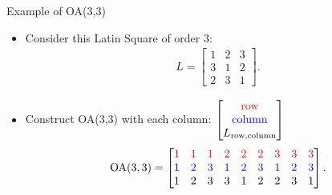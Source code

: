 \documentclass{beamer}
\begin{document}
\begin{frame}{Example of OA(3,3)}
  \begin{itemize}
    \item Consider this Latin Square of order 3:
    \[
    \begin{aligned}
        L = \begin{bmatrix}
            1&2&3\\
            3&1&2\\
            2&3&1
        \end{bmatrix}.
    \end{aligned}
    \]
    \item Construct OA(3,3) with each column: 
    $\begin{bmatrix}
    \textcolor{red}{\text{row}}\\
    \textcolor{blue}{\text{column}}\\
    L_{\text{row},\text{column}}\end{bmatrix}$
    \[
    \begin{aligned}
        \text{OA}(3,3) = \begin{bmatrix}
            \textcolor{red}{1}&\textcolor{red}{1}&\textcolor{red}{1}&\textcolor{red}{2}&\textcolor{red}{2}&\textcolor{red}{2}&\textcolor{red}{3}&\textcolor{red}{3}&\textcolor{red}{3}\\
            \textcolor{blue}{1}&\textcolor{blue}{2}&\textcolor{blue}{3}&\textcolor{blue}{1}&\textcolor{blue}{2}&\textcolor{blue}{3}&\textcolor{blue}{1}&\textcolor{blue}{2}&\textcolor{blue}{3}\\
            1&2&3&3&1&2&2&3&1
        \end{bmatrix}.
    \end{aligned}
    \]
  \end{itemize}
\end{frame}
\end{document}
